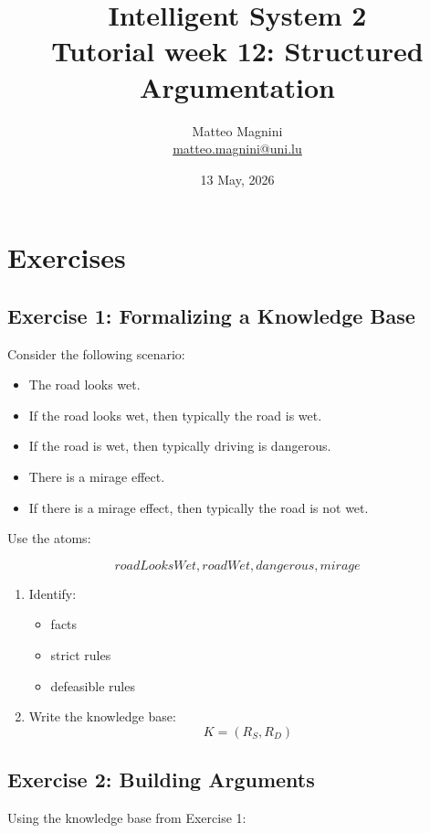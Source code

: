 \documentclass[11pt]{article}
\title{
    Intelligent System 2\\
    Tutorial week 12: Structured Argumentation
}
\author{
    Matteo Magnini\\
    \href{mailto:matteo.magnini@uni.lu}{matteo.magnini@uni.lu}
}
\date{
    13 May, 2026
}
\begin{document}
\maketitle

\section{Exercises}

\subsection{Exercise 1: Formalizing a Knowledge Base}

Consider the following scenario:

\begin{itemize}
    \item The road looks wet.
    \item If the road looks wet, then typically the road is wet.
    \item If the road is wet, then typically driving is dangerous.
    \item There is a mirage effect.
    \item If there is a mirage effect, then typically the road is not wet.
\end{itemize}

Use the atoms:

\[
roadLooksWet,
roadWet,
dangerous,
mirage
\]

\begin{enumerate}
    \item Identify:
    \begin{itemize}
        \item facts
        \item strict rules
        \item defeasible rules
    \end{itemize}

    \item Write the knowledge base:
    \[
    K = (R_S,R_D)
    \]
\end{enumerate}

\subsection{Exercise 2: Building Arguments}

Using the knowledge base from Exercise 1:
\end{document}
